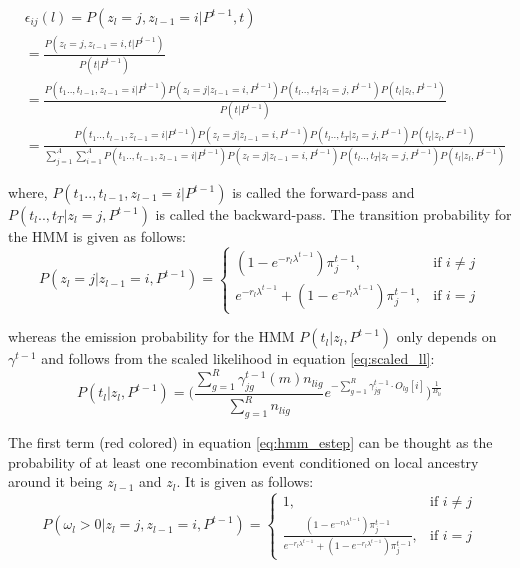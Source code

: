 \begin{footnotesize}
\begin{align}
    &\epsilon_{ij}(l) =P(z_l = j, z_{l-1} = i \vert P^{t-1}, t) \nonumber \\
    &= \frac{P(z_l = j, z_{l-1} = i, t \vert P^{t-1})}{P(t \vert P^{t-1})} \nonumber \\
    &= \frac{P(t_1 .., t_{l-1}, z_{l-1}=i \vert P^{t-1}) P(z_l=j \vert z_{l-1}=i, P^{t-1}) P(t_{l} .., t_T \vert z_l=j, P^{t-1}) P(t_l \vert z_l, P^{t-1})}{P(t \vert P^{t-1})} \nonumber \\
    &= \frac{P(t_1 .., t_{l-1}, z_{l-1}=i \vert P^{t-1}) P(z_l=j \vert z_{l-1}=i, P^{t-1}) P(t_{l} .., t_T \vert z_l=j, P^{t-1}) P(t_l \vert z_l, P^{t-1})}{\sum\limits_{j=1}^{A}\sum\limits_{i=1}^{A} P(t_1 .., t_{l-1}, z_{l-1}=i \vert P^{t-1}) P(z_l=j \vert z_{l-1}=i, P^{t-1}) P(t_{l} .., t_T \vert z_l=j, P^{t-1}) P(t_l \vert z_l, P^{t-1})}
\label{eq:epsilon_ij}
\end{align}
\end{footnotesize}
where, $P(t_1 .., t_{l-1}, z_{l-1}=i \vert P^{t-1})$ is called the forward-pass and $P(t_{l} .., t_T \vert z_l=j, P^{t-1})$ is called the backward-pass. The transition probability for the HMM is given as follows:
\begin{equation}
     P(z_l=j \vert z_{l-1}=i, P^{t-1}) = \begin{cases} (1 - e^{-r_l \lambda^{t-1}})\pi_j^{t-1}, & \text{if } i \neq j \\ e^{-r_l \lambda^{t-1}} + (1 - e^{-r_l \lambda^{t-1}})\pi_j^{t-1} , & \text{if } i = j \end{cases}
\end{equation}

whereas the emission probability for the HMM $P(t_l \vert z_l, P^{t-1})$ only depends on $\gamma^{t-1}$ and follows from the scaled likelihood in equation \ref{eq:scaled_ll}:
\begin{equation}
   P(t_l \vert z_l, P^{t-1}) =  \Big( \frac{\sum_{g=1}^R\gamma^{t-1}_{jg}(m)n_{lig}}{\sum_{g=1}^R n_{lig}}e^{-\sum_{g=1}^R \gamma^{t-1}_{jg} \cdot O_{lg}[i]} \Big)^{\frac{1}{B_{li}}}
\end{equation}

The first term (red colored) in equation \ref{eq:hmm_estep} can be thought as the probability of at least one recombination event conditioned on local ancestry around it being $z_{l-1}$ and $z_l$. It is given as follows:
\begin{equation}
  P(\omega_l > 0 \vert z_l = j, z_{l-1} = i, P^{t-1}) = \begin{cases} 1, & \text{if } i \neq j \\ \frac{(1 - e^{-r_l \lambda^{t-1}})\pi_j^{t-1}}{e^{-r_l \lambda^{t-1}} + (1 - e^{-r_l \lambda^{t-1}})\pi_j^{t-1}} , & \text{if } i = j \end{cases}
\label{eq:e_of_recomb>0}
\end{equation}

